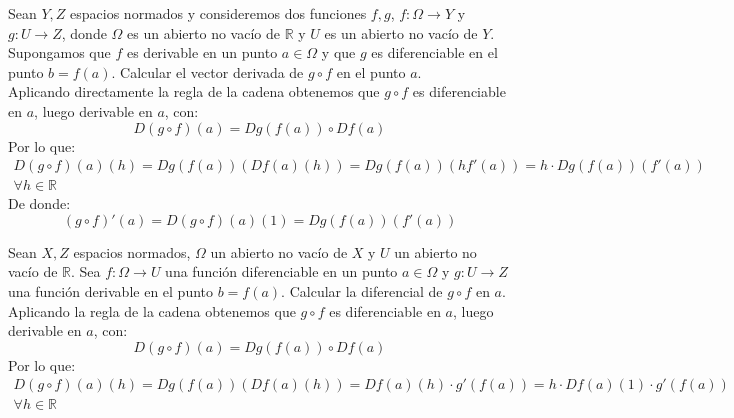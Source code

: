 \begin{ejercicio}
Sean \( Y,Z \) espacios normados y consideremos dos funciones $f,g$, \( f: \Omega \rightarrow Y \) y \( g : U \rightarrow Z \), donde \( \Omega \) es un abierto no vacío de \( \mathbb{R} \) y \( U \) es un abierto no vacío de \( Y \). Supongamos que \( f \) es derivable en un punto \( a \in \Omega \) y que \( g \) es diferenciable en el punto \( b = f(a) \). Calcular el vector derivada de \( g \circ f \) en el punto \( a \).\\

\noindent
Aplicando directamente la regla de la cadena obtenemos que $g\circ f$ es diferenciable en $a$, luego derivable en $a$, con:
\begin{equation*}
    D(g\circ f)(a) = Dg(f(a)) \circ Df(a)
\end{equation*}
Por lo que:
\begin{multline*}
    D(g\circ f)(a)(h) = Dg(f(a))(Df(a)(h)) = Dg(f(a))(hf'(a)) = h\cdot Dg(f(a))(f'(a)) \\ \forall h\in \mathbb{R}
\end{multline*}
De donde:
\begin{equation*}
    (g\circ f)'(a) = D(g\circ f)(a)(1) = Dg(f(a))(f'(a))
\end{equation*}
\end{ejercicio}

\begin{ejercicio}
Sean \( X,Z \) espacios normados, \( \Omega \) un abierto no vacío de \( X \) y \( U \) un abierto no vacío de \( \mathbb{R} \). Sea \( f : \Omega \rightarrow U \) una función diferenciable en un punto \( a \in \Omega \) y \( g : U \rightarrow Z \) una función derivable en el punto \( b = f(a) \). Calcular la diferencial de \( g \circ f \) en \( a \).\\ 

\noindent
Aplicando la regla de la cadena obtenemos que $g\circ f$ es diferenciable en $a$, luego derivable en $a$, con:
\begin{equation*}
    D(g\circ f)(a) = Dg(f(a)) \circ Df(a)
\end{equation*}
Por lo que:
\begin{multline*}
    D(g\circ f)(a)(h) = Dg(f(a))(Df(a)(h)) = Df(a)(h)\cdot g'(f(a)) = h\cdot Df(a)(1)\cdot g'(f(a))\\ \forall h\in \mathbb{R}
\end{multline*}
\end{ejercicio}

